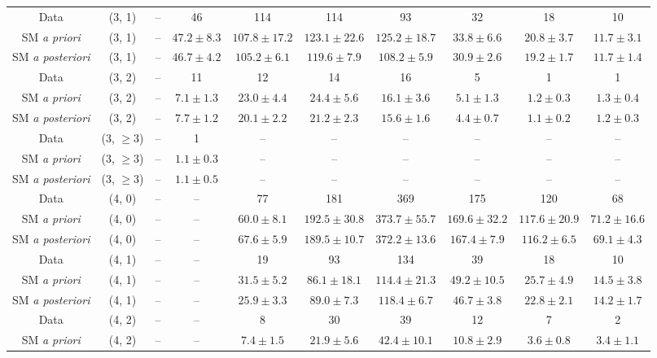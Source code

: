 \begin{table}[h!]
{\begin{tabular}{cccccccccc}
	Data & (3, 1) & -- & 46 & 114 & 114 & 93 & 32 & 18 & 10 \\[0.5ex] 
	SM \textit{a priori} & (3, 1) & -- & $47.2\pm 8.3$ & $107.8\pm 17.2$ & $123.1\pm 22.6$ & $125.2\pm 18.7$ & $33.8\pm 6.6$ & $20.8\pm 3.7$ & $11.7\pm 3.1$ \\[0.5ex] 
	SM \textit{a posteriori} & (3, 1) & -- & $46.7\pm 4.2$ & $105.2\pm 6.1$ & $119.6\pm 7.9$ & $108.2\pm 5.9$ & $30.9\pm 2.6$ & $19.2\pm 1.7$ & $11.7\pm 1.4$ \\[0.5ex] 
	Data & (3, 2) & -- & 11 & 12 & 14 & 16 & 5 & 1 & 1 \\[0.5ex] 
	SM \textit{a priori} & (3, 2) & -- & $7.1\pm 1.3$ & $23.0\pm 4.4$ & $24.4\pm 5.6$ & $16.1\pm 3.6$ & $5.1\pm 1.3$ & $1.2\pm 0.3$ & $1.3\pm 0.4$ \\[0.5ex] 
	SM \textit{a posteriori} & (3, 2) & -- & $7.7\pm 1.2$ & $20.1\pm 2.2$ & $21.2\pm 2.3$ & $15.6\pm 1.6$ & $4.4\pm 0.7$ & $1.1\pm 0.2$ & $1.2\pm 0.3$ \\[0.5ex] 
	Data & (3, $\ge3$) & -- & 1 & -- & -- & -- & -- & -- & -- \\[0.5ex] 
	SM \textit{a priori} & (3, $\ge3$) & -- & $1.1\pm 0.3$ & -- & -- & -- & -- & -- & -- \\[0.5ex] 
	SM \textit{a posteriori} & (3, $\ge3$) & -- & $1.1\pm 0.5$ & -- & -- & -- & -- & -- & -- \\[0.5ex] 
	Data & (4, 0) & -- & -- & 77 & 181 & 369 & 175 & 120 & 68 \\[0.5ex] 
	SM \textit{a priori} & (4, 0) & -- & -- & $60.0\pm 8.1$ & $192.5\pm 30.8$ & $373.7\pm 55.7$ & $169.6\pm 32.2$ & $117.6\pm 20.9$ & $71.2\pm 16.6$ \\[0.5ex] 
	SM \textit{a posteriori} & (4, 0) & -- & -- & $67.6\pm 5.9$ & $189.5\pm 10.7$ & $372.2\pm 13.6$ & $167.4\pm 7.9$ & $116.2\pm 6.5$ & $69.1\pm 4.3$ \\[0.5ex] 
	Data & (4, 1) & -- & -- & 19 & 93 & 134 & 39 & 18 & 10 \\[0.5ex] 
	SM \textit{a priori} & (4, 1) & -- & -- & $31.5\pm 5.2$ & $86.1\pm 18.1$ & $114.4\pm 21.3$ & $49.2\pm 10.5$ & $25.7\pm 4.9$ & $14.5\pm 3.8$ \\[0.5ex] 
	SM \textit{a posteriori} & (4, 1) & -- & -- & $25.9\pm 3.3$ & $89.0\pm 7.3$ & $118.4\pm 6.7$ & $46.7\pm 3.8$ & $22.8\pm 2.1$ & $14.2\pm 1.7$ \\[0.5ex] 
	Data & (4, 2) & -- & -- & 8 & 30 & 39 & 12 & 7 & 2 \\[0.5ex] 
	SM \textit{a priori} & (4, 2) & -- & -- & $7.4\pm 1.5$ & $21.9\pm 5.6$ & $42.4\pm 10.1$ & $10.8\pm 2.9$ & $3.6\pm 0.8$ & $3.4\pm 1.1$ \\[0.5ex] 

\end{tabular}}
\end{table}
